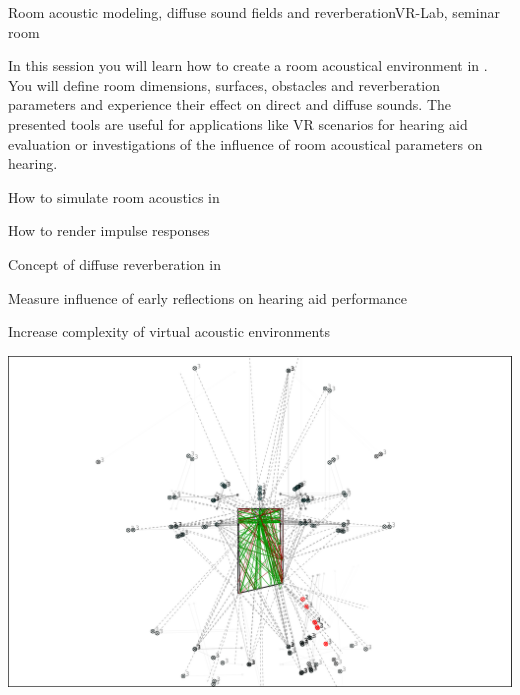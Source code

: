 \documentclass[11pt,a4paper,twoside]{article}
\begin{document}
\setcounter{tutorial}{3}
\begin{tutorial}{Room acoustic modeling, diffuse sound fields and reverberation}{VR-Lab, seminar room}

In this session you will learn how to create a room acoustical
environment in \tascar{}.
%
You will define room dimensions, surfaces, obstacles and reverberation
parameters and experience their effect on direct and diffuse
sounds.
%
The presented tools are useful for applications like VR scenarios for
hearing aid evaluation or investigations of the influence of room
acoustical parameters on hearing.

\begin{learnitems}
\item How to simulate room acoustics in \tascar{}
\item How to render impulse responses
\item Concept of diffuse reverberation in \tascar{}
\end{learnitems}

\begin{appitems}
\item Measure influence of early reflections on hearing aid performance
\item Increase complexity of virtual acoustic environments
\end{appitems}

\medskip

\centerline{\includegraphics[width=0.9\columnwidth]{t4_acmodel}}

\end{tutorial}

\ifshowtutorial

\newpage
\end{document}

